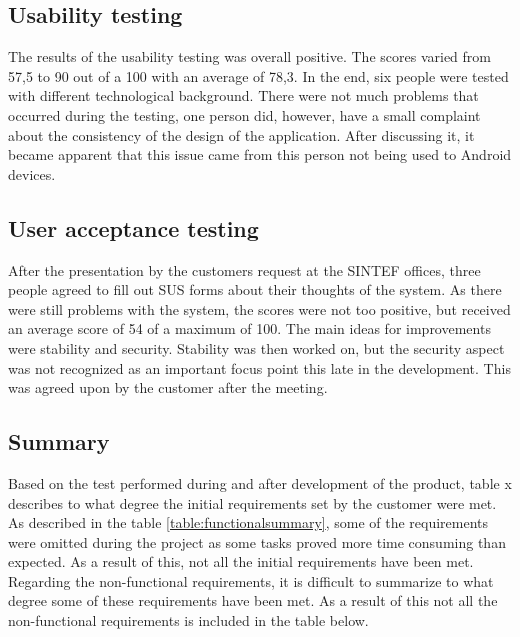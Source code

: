 		\subsection{Usability testing}
		The results of the usability testing was overall positive. The scores varied from 57,5 to 90 out of a 100 with an average of 78,3. In the end, six people were tested with different technological background. There were not much problems that occurred during the testing, one person did, however, have a small complaint about the consistency of the design of the application. After discussing it, it became apparent that this issue came from this person not being used to Android devices. 


		\subsection{User acceptance testing}
		After the presentation by the customers request at the SINTEF offices, three people agreed to fill out SUS forms about their thoughts of the system. As there were still problems with the system, the scores were not too positive, but received an average score of 54 of a maximum of 100. The main ideas for improvements were stability and security. Stability was then worked on, but the security aspect was not recognized as an important focus point this late in the development. This was agreed upon by the customer after the meeting.

		\subsection{Summary}
		Based on the test performed during and after development of the product, table x describes to what degree the initial requirements set by the customer were met. As described in the table \ref{table:functionalsummary}, some of the requirements were omitted during the project as some tasks proved more time consuming than expected. As a result of this, not all the initial requirements have been met. \\
		\newline
		Regarding the non-functional requirements, it is difficult to summarize to what degree some of these requirements have been met. As a result of this not all the non-functional requirements is included in the table below.


